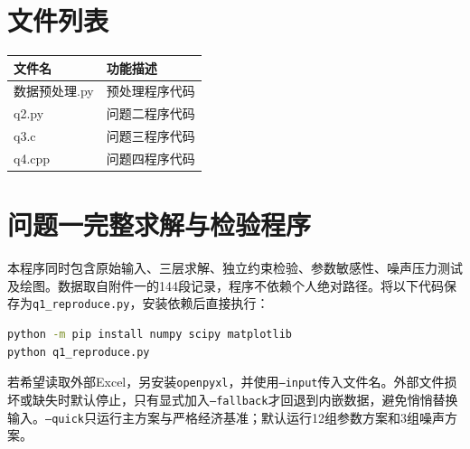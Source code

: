 \documentclass[withoutpreface,bwprint]{cumcmthesis}
\begin{document}
\newpage
\begin{appendices}
	
	
	
	
\section{文件列表}
\begin{table}[H]
\centering
\begin{tabularx}{\textwidth}{LL}
\toprule
文件名   & 功能描述 \\
\midrule
数据预处理.py & 预处理程序代码 \\
q2.py & 问题二程序代码 \\
q3.c & 问题三程序代码 \\
q4.cpp & 问题四程序代码 \\
\bottomrule
\end{tabularx}
\label{tab:文件列表}
\end{table}








%
%
%
%
%
%
%
%
%

\clearpage
\section{问题一完整求解与检验程序}\label{app:q1-code}
本程序同时包含原始输入、三层求解、独立约束检验、参数敏感性、噪声压力测试及绘图。数据取自附件一的144段记录，程序不依赖个人绝对路径。将以下代码保存为\texttt{q1\_reproduce.py}，安装依赖后直接执行：
\begin{lstlisting}[language=bash,basicstyle=\ttfamily\small,frame=single,numbers=none]
python -m pip install numpy scipy matplotlib
python q1_reproduce.py
\end{lstlisting}
若希望读取外部Excel，另安装\texttt{openpyxl}，并使用\texttt{--input}传入文件名。外部文件损坏或缺失时默认停止，只有显式加入\texttt{--fallback}才回退到内嵌数据，避免悄悄替换输入。\texttt{--quick}只运行主方案与严格经济基准；默认运行12组参数方案和3组噪声方案。


\end{appendices}
\end{document}
